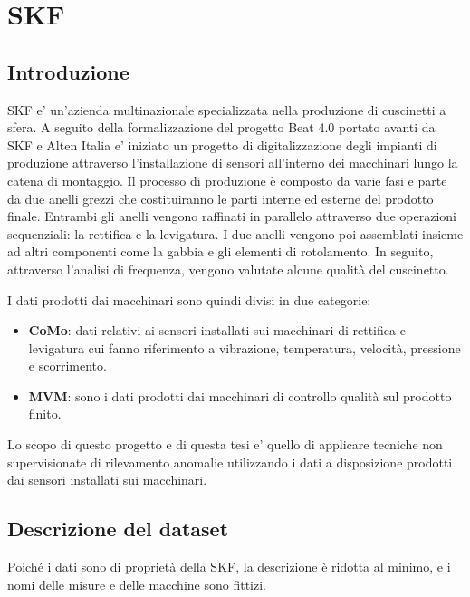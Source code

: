 \chapter{SKF}

\section{Introduzione}
SKF e' un'azienda multinazionale specializzata nella produzione di cuscinetti a sfera. A seguito della formalizzazione del progetto Beat 4.0 portato avanti da SKF e Alten Italia e' iniziato un progetto di digitalizzazione degli impianti di produzione attraverso l'installazione di sensori all'interno dei macchinari lungo la catena di montaggio.
Il processo di produzione è composto da varie fasi e parte da due anelli grezzi che costituiranno le parti interne ed esterne del prodotto finale. Entrambi gli anelli vengono raffinati
in parallelo attraverso due operazioni sequenziali: la rettifica e la levigatura. 
I due anelli vengono poi assemblati insieme ad altri componenti come la gabbia e gli elementi di rotolamento. In seguito, attraverso l'analisi di frequenza, vengono valutate alcune qualità del cuscinetto.

I dati prodotti dai macchinari sono quindi divisi in due categorie: 
\begin{itemize}
  \item \textbf{CoMo}: dati relativi ai sensori installati sui macchinari di rettifica e levigatura cui fanno riferimento a vibrazione, temperatura, velocità, pressione e scorrimento.
  \item \textbf{MVM}: sono i dati prodotti dai macchinari di controllo qualità sul prodotto finito.
\end{itemize}

Lo scopo di questo progetto e di questa tesi e' quello di applicare tecniche non supervisionate di rilevamento anomalie utilizzando i dati a disposizione prodotti dai sensori installati sui macchinari.

\section{Descrizione del dataset}
Poiché i dati sono di proprietà della SKF, la descrizione è ridotta al minimo, e i nomi delle misure e delle macchine sono fittizi.


